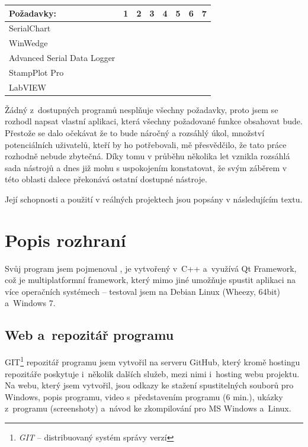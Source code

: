 \documentclass[12pt, a4paper, oneside]{article}
\newcommand{\It}{\textit}  %
\newcommand{\Has}{\textcolor{green}{\CheckmarkBold}}
\newcommand{\NoHas}{\textcolor{red}{\XSolidBrush}}
\begin{document}
\begin{tabular}{ | l | l | l | l | l | l | l | l |}
    \hline
    Požadavky:                  & 1      & 2      & 3      & 4      & 5      & 6      & 7      \\ \hline
    SerialChart                 & \Has   & \NoHas & \Has   & \NoHas & \Has   & \Has   & \Has   \\ \hline 
    WinWedge                    & \NoHas & \Has   & \Has   & \NoHas & \NoHas & \NoHas & \NoHas \\ \hline 
    Advanced Serial Data Logger & \NoHas & \Has   & \Has   & \NoHas & \NoHas & \NoHas & \NoHas \\ \hline 
    StampPlot Pro               & \Has   & \Has   & \NoHas & \NoHas & \Has   & \NoHas & \Has   \\ \hline 
    LabVIEW                     & \Has   & \Has   & \NoHas & \Has   & \NoHas & \NoHas & \Has   \\ \hline
\end{tabular}

\vspace{5mm}

Žádný z~dostupných programů nesplňuje všechny požadavky, proto jsem se rozhodl napsat vlastní aplikaci, která všechny požadované funkce obsahovat bude.  Přestože se dalo očekávat že to bude náročný a rozsáhlý úkol, množství potenciálních uživatelů, kteří by ho potřebovali, mě přesvědčilo, že tato práce rozhodně nebude zbytečná. Díky tomu v průběhu několika let vznikla rozsáhlá sada nástrojů a dnes již mohu s uspokojením konstatovat, že svým záběrem v této oblasti dalece překonává ostatní dostupné nástroje.

Její schopnosti a použití v reálných projektech jsou popsány v následujícím textu.

\newpage
\section{Popis rozhraní}
Svůj program jsem pojmenoval , je vytvořený v~C++ a~využívá Qt Framework\cite{qtfrm}, což je multiplatformní framework, který mimo jiné umožňuje spustit aplikaci na více operačních systémech -- testoval jsem na Debian Linux\cite{debian} (Wheezy, 64bit) a~Windows 7.

\subsection{Web a~repozitář programu}
GIT\footnote{\It{GIT} -- distribuovaný systém správy verzí} repozitář programu jsem vytvořil na serveru GitHub\cite{github}, který kromě hostingu repozitáře poskytuje i~několik dalších služeb, mezi nimi i~hosting webu projektu. Na webu, který jsem vytvořil, jsou odkazy ke stažení spustitelných souborů pro Windows, popis programu, video s~představením programu (6 min.), ukázky z~programu (screenshoty) a~návod ke zkompilování pro MS Windows a~Linux.
\end{document}
